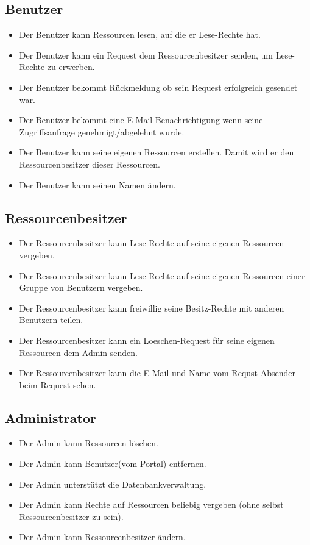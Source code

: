 \documentclass[parskip=full,11pt]{scrartcl}
\begin{document}
\subsection*{Benutzer}
\begin{itemize}[itemsep=0pt]
\item Der Benutzer kann Ressourcen lesen, auf die er Lese-Rechte hat.
\item Der Benutzer kann ein Request dem Ressourcenbesitzer senden, um Lese-Rechte zu erwerben.
\item Der Benutzer bekommt Rückmeldung ob sein Request erfolgreich gesendet war.
\item Der Benutzer bekommt eine E-Mail-Benachrichtigung wenn seine Zugriffsanfrage genehmigt/abgelehnt wurde.
\item Der Benutzer kann seine eigenen Ressourcen erstellen. Damit wird er den Ressourcenbesitzer dieser Ressourcen.
\item Der Benutzer kann seinen Namen ändern.
\end{itemize}
 
\subsection*{Ressourcenbesitzer}
\begin{itemize}[itemsep=0pt]
\item Der Ressourcenbesitzer kann Lese-Rechte auf seine eigenen Ressourcen vergeben.
\item Der Ressourcenbesitzer kann Lese-Rechte auf seine eigenen Ressourcen einer Gruppe von Benutzern vergeben. %
\item Der Ressourcenbesitzer kann freiwillig seine \gls{Besitz-Rechte} mit anderen Benutzern teilen.
\item Der Ressourcenbesitzer kann ein \gls{Loeschen-Request} für seine eigenen Ressourcen dem Admin senden.
\item Der Ressourcenbesitzer kann die E-Mail und Name vom Requst-Absender beim Request sehen.

\end{itemize}

\subsection*{Administrator}
\begin{itemize}[itemsep=0pt]
\item Der Admin kann Ressourcen löschen.
\item Der Admin kann Benutzer(vom Portal) entfernen.
\item Der Admin unterstützt die Datenbankverwaltung.
\item Der Admin kann Rechte auf Ressourcen beliebig vergeben (ohne selbst Ressourcenbesitzer zu sein).
\item Der Admin kann Ressourcenbesitzer ändern. 
\end{itemize}
\end{document}

